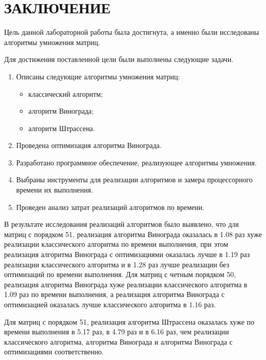 \chapter*{ЗАКЛЮЧЕНИЕ}

Цель данной лабораторной работы была достигнута, а именно были исследованы алгоритмы умножения матриц.


Для достижения поставленной цели были выполнены следующие задачи.
\begin{enumerate}
	\item Описаны следующие алгоритмы умножения матриц:
	\begin{itemize}
		\item классический алгоритм;
		\item алгоритм Винограда;
		\item алгоритм Штрассена.
	\end{itemize}
	\item Проведена оптимизация алгоритма Винограда.
	\item Разработано программное обеспечение, реализующее алгоритмы умножения.
	\item Выбраны инструменты для реализации алгоритмов и замера процессорного времени их выполнения.
	\item Проведен анализ затрат реализаций алгоритмов по времени. 
\end{enumerate}

В результате исследования реализаций алгоритмов было выявлено, что для матриц с порядком 51, реализация алгоритма Винограда оказалась в 1.08 раз хуже реализации классического алгоритма по времени выполнения, при этом реализация алгоритма Винограда с оптимизациями оказалась лучше в 1.19 раз реализации классического алгоритма и в 1.28 раз лучше реализации без оптимизаций по времени выполнения. 
Для матриц с четным порядком 50, реализация алгоритма Винограда хуже реализации классического алгоритма в 1.09 раз по времени выполнения, а реализация алгоритма Винограда с оптимизацией оказалась лучше классического алгоритма в 1.16 раз. 

Для матриц с порядком 51, реализация алгоритма Штрассена оказалась хуже по времени выполнения в 5.17 раз, в 4.79 раз и в 6.16 раз, чем реализации классического алгоритма, алгоритма Винограда и алгоритма Винограда с оптимизациями соответственно. 